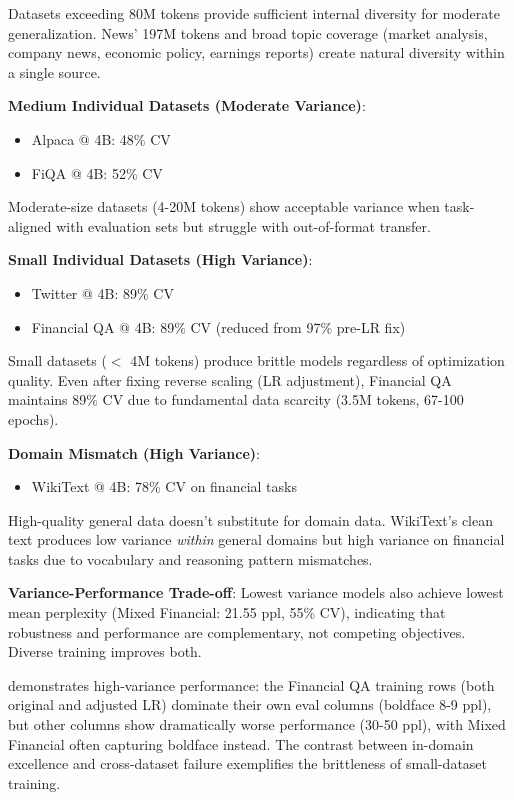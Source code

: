 Datasets exceeding 80M tokens provide sufficient internal diversity for moderate generalization. News' 197M tokens and broad topic coverage (market analysis, company news, economic policy, earnings reports) create natural diversity within a single source.

\textbf{Medium Individual Datasets (Moderate Variance)}:
\begin{itemize}
\item Alpaca @ 4B: 48\% CV
\item FiQA @ 4B: 52\% CV
\end{itemize}

Moderate-size datasets (4-20M tokens) show acceptable variance when task-aligned with evaluation sets but struggle with out-of-format transfer.

\textbf{Small Individual Datasets (High Variance)}:
\begin{itemize}
\item Twitter @ 4B: 89\% CV
\item Financial QA @ 4B: 89\% CV (reduced from 97\% pre-LR fix)
\end{itemize}

Small datasets ($<$ 4M tokens) produce brittle models regardless of optimization quality. Even after fixing reverse scaling (LR adjustment), Financial QA maintains 89\% CV due to fundamental data scarcity (3.5M tokens, 67-100 epochs).

\textbf{Domain Mismatch (High Variance)}:
\begin{itemize}
\item WikiText @ 4B: 78\% CV on financial tasks
\end{itemize}

High-quality general data doesn't substitute for domain data. WikiText's clean text produces low variance \textit{within} general domains but high variance on financial tasks due to vocabulary and reasoning pattern mismatches.

\textbf{Variance-Performance Trade-off}: Lowest variance models also achieve lowest mean perplexity (Mixed Financial: 21.55 ppl, 55\% CV), indicating that robustness and performance are complementary, not competing objectives. Diverse training improves both.



 demonstrates high-variance performance: the Financial QA training rows (both original and adjusted LR) dominate their own eval columns (boldface 8-9 ppl), but other columns show dramatically worse performance (30-50 ppl), with Mixed Financial often capturing boldface instead. The contrast between in-domain excellence and cross-dataset failure exemplifies the brittleness of small-dataset training.

